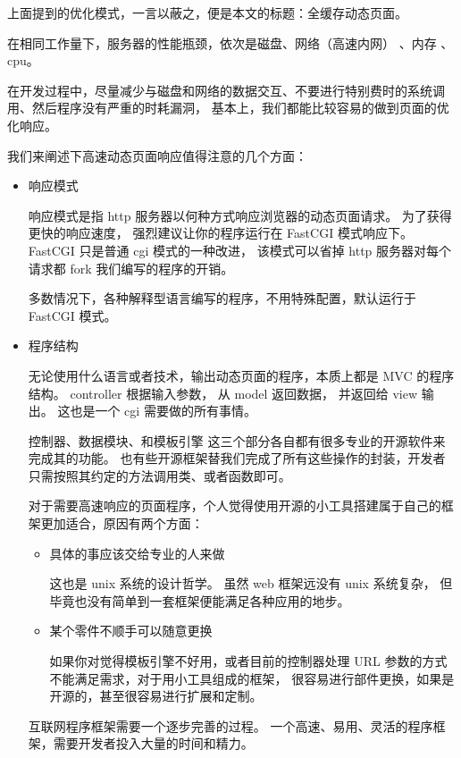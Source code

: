 \documentclass{article}
\begin{document}
  上面提到的优化模式，一言以蔽之，便是本文的标题：全缓存动态页面。

  在相同工作量下，服务器的性能瓶颈，依次是磁盘、网络（高速内网） 、内存 、cpu。

  在开发过程中，尽量减少与磁盘和网络的数据交互、不要进行特别费时的系统调用、然后程序没有严重的时耗漏洞，
  基本上，我们都能比较容易的做到页面的优化响应。

  我们来阐述下高速动态页面响应值得注意的几个方面：

  \begin{itemize}
  \item 响应模式

    响应模式是指 http 服务器以何种方式响应浏览器的动态页面请求。 为了获得更快的响应速度，
    强烈建议让你的程序运行在 FastCGI 模式响应下。 FastCGI 只是普通 cgi 模式的一种改进，
    该模式可以省掉 http 服务器对每个请求都 fork 我们编写的程序的开销。

    多数情况下，各种解释型语言编写的程序，不用特殊配置，默认运行于 FastCGI 模式。
    
  \item 程序结构

    无论使用什么语言或者技术，输出动态页面的程序，本质上都是 MVC 的程序结构。 controller 根据输入参数，
    从 model 返回数据， 并返回给 view 输出。  这也是一个 cgi 需要做的所有事情。

    控制器、数据模块、和模板引擎 这三个部分各自都有很多专业的开源软件来完成其的功能。 
    也有些开源框架替我们完成了所有这些操作的封装，开发者只需按照其约定的方法调用类、或者函数即可。

    对于需要高速响应的页面程序，个人觉得使用开源的小工具搭建属于自己的框架更加适合，原因有两个方面：
    
    \begin{itemize}
    \item 具体的事应该交给专业的人来做

      这也是 unix 系统的设计哲学。 虽然 web 框架远没有 unix 系统复杂，
      但毕竟也没有简单到一套框架便能满足各种应用的地步。

    \item 某个零件不顺手可以随意更换

      如果你对觉得模板引擎不好用，或者目前的控制器处理 URL 参数的方式不能满足需求，对于用小工具组成的框架，
      很容易进行部件更换，如果是开源的，甚至很容易进行扩展和定制。
    \end{itemize}

    互联网程序框架需要一个逐步完善的过程。 一个高速、易用、灵活的程序框架，需要开发者投入大量的时间和精力。


\end{itemize}
\end{document}

